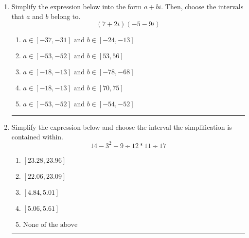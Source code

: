 \documentclass[14pt]{extbook}
\newcommand{\litem}[1]{\item#1\hspace*{-1cm}\rule{\textwidth}{0.4pt}}
\begin{document}
\begin{enumerate}
{\begin{enumerate}[label=\Alph*.]
\end{enumerate} }
\litem{
Simplify the expression below into the form $a+bi$. Then, choose the intervals that $a$ and $b$ belong to.\[ (7 + 2 i)(-5 - 9 i) \]\begin{enumerate}[label=\Alph*.]
\item \( a \in [-37, -31] \text{ and } b \in [-24, -13] \)
\item \( a \in [-53, -52] \text{ and } b \in [53, 56] \)
\item \( a \in [-18, -13] \text{ and } b \in [-78, -68] \)
\item \( a \in [-18, -13] \text{ and } b \in [70, 75] \)
\item \( a \in [-53, -52] \text{ and } b \in [-54, -52] \)

\end{enumerate} }
\litem{
Simplify the expression below and choose the interval the simplification is contained within.\[ 14 - 3^2 + 9 \div 12 * 11 \div 17 \]\begin{enumerate}[label=\Alph*.]
\item \( [23.28, 23.96] \)
\item \( [22.06, 23.09] \)
\item \( [4.84, 5.01] \)
\item \( [5.06, 5.61] \)
\item \( \text{None of the above} \)

\end{enumerate} }
\end{enumerate}
\end{document}
